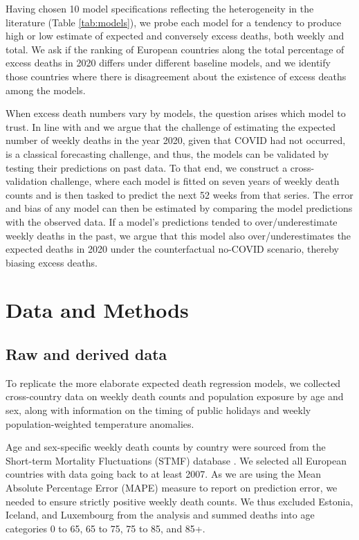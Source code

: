 \documentclass[12pt]{article}
\begin{document}
Having chosen 10 model specifications reflecting the heterogeneity in the literature (Table \ref{tab:models}), we probe each model for a tendency to produce high or low estimate of expected and conversely excess deaths, both weekly and total. We ask if the ranking of European countries along the total percentage of excess deaths in 2020 differs under different baseline models, and we identify those countries where there is disagreement about the existence of excess deaths among the models.

When excess death numbers vary by models, the question arises which model to trust. In line with \cite{Kontis2020} and \cite{Modi2020} we argue that the challenge of estimating the expected number of weekly deaths in the year 2020, given that COVID had not occurred, is a classical forecasting challenge, and thus, the models can be validated by testing their predictions on past data. To that end, we construct a cross-validation challenge, where each model is fitted on seven years of weekly death counts and is then tasked to predict the next 52 weeks from that series. The error and bias of any model can then be estimated by comparing the model predictions with the observed data. If a model's predictions tended to over/underestimate weekly deaths in the past, we argue that this model also over/underestimates the expected deaths in 2020 under the counterfactual no-COVID scenario, thereby biasing excess deaths.

\section*{Data and Methods}

\subsection*{Raw and derived data}


To replicate the more elaborate expected death regression models, we collected cross-country data on weekly death counts and population exposure by age and sex, along with information on the timing of public holidays and weekly population-weighted temperature anomalies.


Age and sex-specific weekly death counts by country were sourced from the Short-term Mortality Fluctuations (STMF) database \citep{Jdanov2021, Nemeth2021}. We selected all European countries with data going back to at least 2007. As we are using the Mean Absolute Percentage Error (MAPE) measure to report on prediction error, we needed to ensure strictly positive weekly death counts. We thus excluded Estonia, Iceland, and Luxembourg from the analysis and summed deaths into age categories 0 to 65, 65 to 75, 75 to 85, and 85+.
\end{document}
